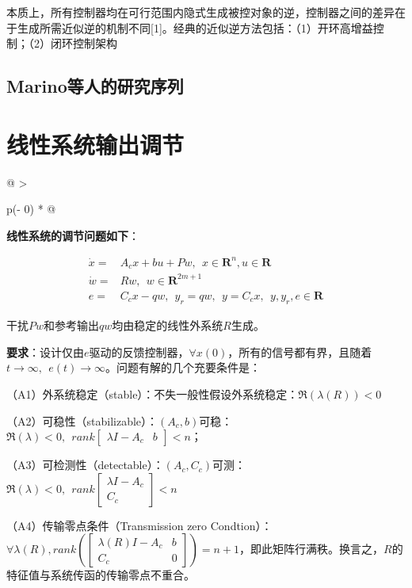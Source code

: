 \documentclass[
  12pt,
  a4paper
]{article}
\begin{document}
本质上，所有控制器均在可行范围内隐式生成被控对象的逆，控制器之间的差异在于生成所需近似逆的机制不同{[}1{]}。经典的近似逆方法包括：（1）开环高增益控制；（2）闭环控制架构

\subsection{Marino等人的研究序列}\label{marinoux7b49ux4ebaux7684ux7814ux7a76ux5e8fux5217}

\section{线性系统输出调节}\label{ux7ebfux6027ux7cfbux7edfux8f93ux51faux8c03ux8282}

\begin{longtable}[]{@{}
  >{\raggedright\arraybackslash}p{}@{}}
\toprule\noalign{}
\begin{minipage}[b]{\linewidth}\raggedright
\textbf{线性系统的调节问题如下}：

\[\begin{aligned}
\dot{x} = & A_{c}x + bu + Pw,\ \ x \in \mathbf{R}^{n},u \in \mathbf{R} \\
\dot{w} = & Rw,\ \ w \in \mathbf{R}^{2m + 1} \\
e = & {C_{c}x - qw,\ \ y}_{r} = qw,\ \ y = C_{c}x,\ \ y,y_{r},e \in \mathbf{R}
\end{aligned}\]

干扰\(Pw\)和参考输出\(qw\)均由稳定的线性外系统\(R\)生成。

\textbf{要求}：设计仅由\(e\)驱动的反馈控制器，\(\forall x(0)\)，所有的信号都有界，且随着\(t \rightarrow \infty,\ \ e(t) \rightarrow \infty\)。问题有解的几个充要条件是：

（A1）外系统稳定（stable）：不失一般性假设外系统稳定：\(\mathfrak{R}\left( \lambda(R) \right) < 0\)

（A2）可稳性（stabilizable）：\(\left( A_{c},b \right)\)可稳：\(\mathfrak{R}(\lambda) < 0,\ \ rank\begin{bmatrix}
\lambda I - A_{c} & b
\end{bmatrix} < n\)；

（A3）可检测性（detectable）：\((A_{c},C_{c})\)可测：\(\mathfrak{R}(\lambda) < 0,\ \ rank\begin{bmatrix}
\lambda I - A_{c} \\
C_{c}
\end{bmatrix} < n\)

（A4）传输零点条件（Transmission zero
Condtion）：\(\forall\lambda(R),rank\left( \begin{bmatrix}
\lambda(R)I - A_{c} & b \\
C_{c} & 0
\end{bmatrix} \right) = n + 1\)，即此矩阵行满秩。换言之，\(R\)的特征值与系统传函的传输零点不重合。


\end{minipage}
\end{longtable}
\end{document}
